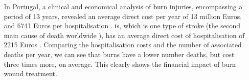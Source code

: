 In Portugal, a clinical and economical analysis of burn injuries, encompassing a period of 13 years, revealed an average direct cost per year of 13 million Euros, and 6741 Euros per hospitalisation \cite{Santos_2016_burden_burns_portugal}. \gls{is}, which is one type of stroke (the second main cause of death worldwide \cite{GHE2016_xls}), has an average direct cost of hospitalisation of 2215 Euros \cite{Santos_2017_atrial_fibrillation_stroke}. Comparing the hospitalisation costs and the number of associated deaths per year, we can see that burns have a lower number deaths, but cost three times more, on average. This clearly shows the financial impact of burn wound treatment. \\ 

\begin{comment}
According to the \citeauthor{who2008_plan_burn_prevention_care} (WHO) \cite{who2011_sucess_stories}, the occurrence and outcome severity of burn injuries are higher on \gls{lmic} than on \gls{hic}, with 95\% of annual casualties happening on \gls{lmic}. The death rate in \gls{lmic} is about 6 times larger than on \gls{hic}, reaching around 5.5 deaths/100 000 people per year \cite{who2011_sucess_stories}. 

The disparity on resources between \gls{hic} and \gls{lmic} means the former has a better leverage to develop strategies to reduce the onset of burn events and lower its morbidity and mortality. Valid strategies consist of: (a) the implementation of effective prevention plans, (b) providing better first-aid and medical care, (c) the application of follow-up intervention for rehabilitation and psychological support, or (d) the development of research efforts to better understand the reality of burn injuries. \cite{who2008_plan_burn_prevention_care, who2011_sucess_stories}. The implementation of these strategies on high income countries have "effectively and sustainably" reduced the number of events and mortality over the last three to four decades \cite{who2011_sucess_stories}. 
Now, the focus of \gls{hic} is on better medical care to improve healing and reduce scarring, or to provide rehabilitation and psychological support. Restoring "form and function have become the hallmarks of excellent burn care" \cite{isbi_guidelines_burn_care}. On \gls{lmic}, the main focus should be on reducing the occurrence, morbidity and mortality. This means they need to place more effort on prevention, first-aid care and hospital care \cite{who2008_plan_burn_prevention_care, who2011_sucess_stories}.

The occurrence by cause of burn varies between \gls{hic} and \gls{lmic}. In \gls{hic} the most common cause are scalds associated with food preparation or consumption and bathing. The victims of these scalds tend to be infants younger than 5 years old. In \gls{lmic} flame burns are the most common. They are usually related with the usage of unsafe stoves and lamps. Scalds, generally, lead to non-lethal burns, however, on younger ages, in many cases it leads to death. Burns by flame are more lethal, usually having higher \gls{tbsa} and depth \cite{who2011_sucess_stories, who_unicef2008_burns_chapter}.\\
\end{comment}

